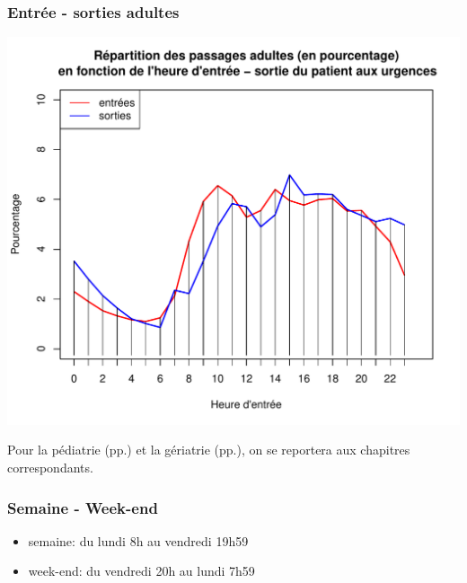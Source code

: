 \documentclass[12pt,english,french,twoside]{book}\usepackage[]{graphicx}\usepackage[]{color}
\makeatletter
\def\maxwidth{ %
  \ifdim\Gin@nat@width>\linewidth
    \linewidth
  \else
    \Gin@nat@width
  \fi
}
\newenvironment{knitrout}{}{} %
\makeatother
\begin{document}
\subsubsection*{Entrée - sorties adultes}

\begin{center}
\begin{knitrout}
\color{fgcolor}
\includegraphics[width=\maxwidth]{figure/es_adultes} 

\end{knitrout}

\label{fig:es_adultes}
\end{center}

Pour la pédiatrie (pp.\pageref{chap_pediatrie}) et la gériatrie (pp.\pageref{chap_geriatrie}), on se reportera aux chapitres correspondants.

\subsubsection*{Semaine - Week-end}


\begin{itemize}
  \item semaine: du lundi 8h au vendredi 19h59
  \item week-end: du vendredi 20h au lundi 7h59
\end{itemize}
\end{document}
